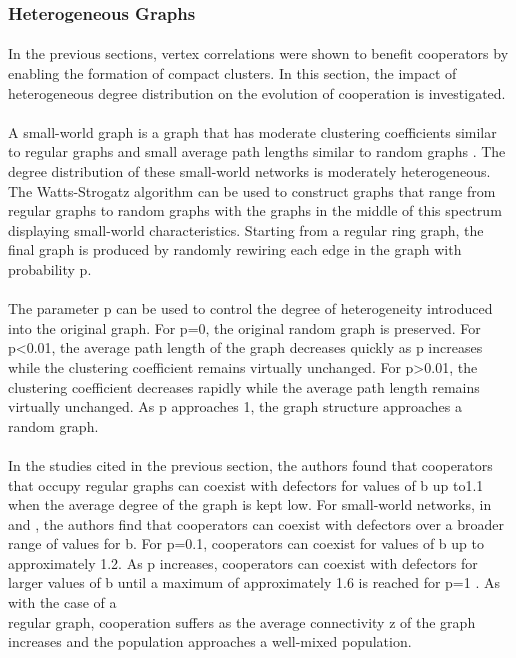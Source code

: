 \documentclass{article}
\begin{document}
    \subsubsection{Heterogeneous Graphs}
	\paragraph{}In the previous sections, vertex correlations were shown to benefit cooperators by enabling the formation of compact clusters.  In this section, the impact of heterogeneous degree distribution on the evolution of cooperation is investigated.
	\paragraph{}A small-world graph is a graph that has moderate clustering coefficients similar to regular graphs and small average path lengths similar to random graphs \cite{Watts1998}.  The degree distribution of these small-world networks is moderately heterogeneous.  The Watts-Strogatz algorithm \cite{Watts1998} can be used to construct graphs that range from regular graphs to random graphs with the graphs in the middle of this spectrum displaying small-world characteristics.  Starting from a regular ring graph, the final graph is produced by randomly rewiring each edge in the graph with probability p.
	\paragraph{}The parameter p can be used to control the degree of heterogeneity introduced into the original graph.  For p=0, the original random graph is preserved.  For p<0.01, the average path length of the graph decreases quickly as p increases while the clustering coefficient remains virtually unchanged.  For p>0.01, the clustering coefficient decreases rapidly while the average path length remains virtually unchanged.  As p approaches 1, the graph structure approaches a random graph.
	\paragraph{}In the studies cited in the previous section, the authors found that cooperators that occupy regular graphs can coexist with defectors for values of b up to1.1 when the average degree of the graph is kept low.  For small-world networks, in \cite{Pacheco2005} and \cite{Santos2006b}, the authors find that cooperators can coexist with defectors over a broader range of values for b.  For p=0.1, cooperators can coexist for values of b up to approximately 1.2.  As p increases, cooperators can coexist with defectors for larger values of b until a maximum of approximately 1.6 is reached for p=1 \cite{Santos2006b}.  As with the case of a \\
	\newpage
	regular graph, cooperation suffers as the average connectivity z of the graph increases and the population approaches a well-mixed population.
\end{document}
